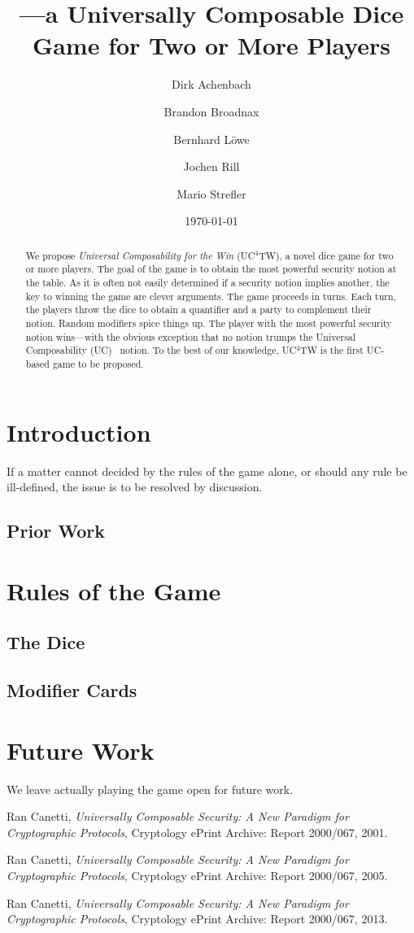 \documentclass{llncs}
\title{\ucftw---a Universally Composable Dice Game for Two or More Players}
\date{\today}
\author{Dirk Achenbach\inst{1} \and Brandon Broadnax\inst{1} \and Bernhard Löwe\inst{1} \and Jochen Rill\inst{2} \and Mario Strefler\inst{1}}
\institute{Karlsruhe Institute of Technology (KIT) \and FZI Forschungszentrum Informatik}
\newcommand{\ucftw}{UC$^4$TW\xspace}
\begin{document}
\maketitle
\begin{abstract}
	We propose \emph{Universal Composability for the Win} (\ucftw), a novel dice game for two or more players. 
	The goal of the game is to obtain the most powerful security notion at the table. 
	As it is often not easily determined if a security notion implies another, the key to winning the game are clever arguments.
	The game proceeds in turns. 
	Each turn, the players throw the dice to obtain a quantifier and a party to complement their notion. 
	Random modifiers spice things up.
	The player with the most powerful security notion wins---with the obvious exception that no notion trumps the Universal Composability (UC)~\cite{can01,can05,can13} notion.
	To the best of our knowledge, \ucftw is the first UC-based game to be proposed.
\end{abstract}

\section{Introduction}
\begin{theorem}
  If a matter cannot decided by the rules of the game alone, or should any rule be ill-defined, the issue is to be resolved by discussion.
\end{theorem}

\subsection{Prior Work}

\section{Rules of the Game}
\subsection{The Dice}
\subsection{Modifier Cards}

\section{Future Work}
We leave actually playing the game open for future work.

\begin{thebibliography}{9}
  Ran Canetti,
  \emph{Universally Composable Security: A New Paradigm for Cryptographic Protocols},
  Cryptology ePrint Archive: Report 2000/067,
  2001.

  Ran Canetti,
  \emph{Universally Composable Security: A New Paradigm for Cryptographic Protocols},
  Cryptology ePrint Archive: Report 2000/067,
  2005.

  Ran Canetti,
  \emph{Universally Composable Security: A New Paradigm for Cryptographic Protocols},
  Cryptology ePrint Archive: Report 2000/067,
  2013.
\end{thebibliography}
\end{document}
